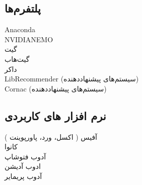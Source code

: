 \documentclass[a4paper]{deedy-persian} %
\begin{document}
\begin{minipage}[t]{0.33\textwidth}
\sectionspace %

\subsection{پلتفرم‌ها}
Anaconda \\
NVIDIA\texttrademark NEMO \\
گیت \\
گیت‌هاب \\
داکر \\
LibRecommender (سیستم‌های پیشنهاد‌دهنده) \\
Cornac (سیستم‌های پیشنهاد‌دهنده)\\

\sectionspace %

\subsection{نرم افزار های کاربردی}
آفیس ( اکسل، ورد، پاورپوینت ) \\
کانوا \\
آدوب فتوشاپ\\
ادوب آدیشن\\
آدوب پریمایر\\


\sectionspace %

\end{minipage} %
\newpage
\end{document}
